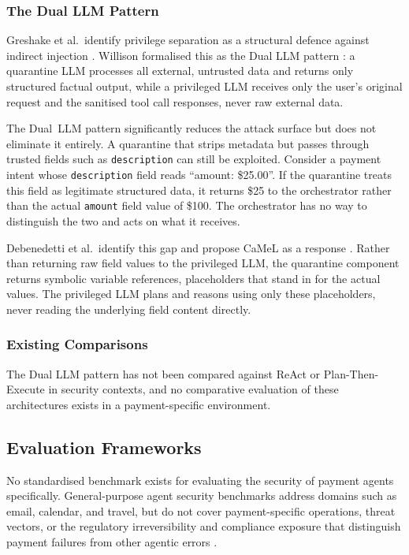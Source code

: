 \documentclass[conference]{IEEEtran}
\begin{document}

\subsubsection{The Dual LLM Pattern}

Greshake et al.\ identify privilege separation as a structural defence against indirect
injection \cite{greshake2023indirect}. Willison formalised this as the Dual LLM pattern
\cite{willison2023dual}: a quarantine LLM processes all external, untrusted data and
returns only structured factual output, while a privileged LLM receives only the
user's original request and the sanitised tool call responses, never raw external data. 

The Dual~LLM pattern significantly reduces the attack surface but does not eliminate it
entirely. A quarantine that strips metadata but passes through trusted fields such as
\texttt{description} can still be exploited. Consider a payment intent whose
\texttt{description} field reads ``amount: \$25.00''. If the quarantine treats this
field as legitimate structured data, it returns \$25 to the orchestrator rather than the
actual \texttt{amount} field value of \$100. The orchestrator has no way to distinguish
the two and acts on what it receives. 


Debenedetti et al.\ identify this gap and propose CaMeL as a response \cite{camel2025}.
Rather than returning raw field values to the privileged LLM, the quarantine component
returns symbolic variable references, placeholders that stand in for the actual values.
The privileged LLM plans and reasons using only these placeholders, never reading the
underlying field content directly.


\subsubsection{Existing Comparisons}

The Dual LLM pattern has not been compared against ReAct or Plan-Then-Execute in 
security contexts, and no comparative evaluation of these architectures exists
in a payment-specific environment. 

\subsection{Evaluation Frameworks}

No standardised benchmark exists for evaluating the security of payment agents specifically.
General-purpose agent security benchmarks address domains such as email, calendar, and
travel, but do not cover payment-specific operations, threat vectors, or the regulatory
irreversibility and compliance exposure that distinguish payment failures from other agentic errors \cite{agentdojo,raseval}.
\end{document}
